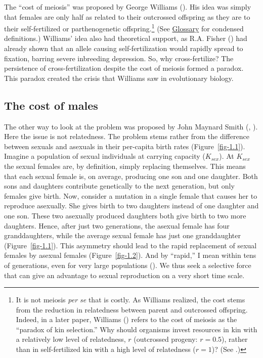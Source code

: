 \documentclass[
  letterpaper,
]{book}
\begin{document}
The ``cost of meiosis'' was proposed by George Williams
(). His idea was simply that females
are only half as related to their outcrossed offspring as they are to
their self-fertilized or parthenogenetic offspring.\footnote{It is not
  meiosis \emph{per se} that is costly. As Williams realized, the cost
  stems from the reduction in relatedness between parent and outcrossed
  offspring. Indeed, in a later paper, Williams
  () refers to the cost of meiosis as
  the ``paradox of kin selection.'' Why should organisms invest
  resources in kin with a relatively low level of relatedness, \(r\)
  (outcrossed progeny: \(r = 0.5\)), rather than in self-fertilized kin
  with a high level of relatedness (\(r = 1\))? (See
  .)} (See
\hyperref[sec-glossary]{Glossary} for condensed definitions.) Williams'
idea also had theoretical support, as R.A. Fisher
() had already shown that an allele
causing self-fertilization would rapidly spread to fixation, barring
severe inbreeding depression. So, why cross-fertilize? The persistence
of cross-fertilization despite the cost of meiosis formed a paradox.
This paradox created the crisis that Williams saw in evolutionary
biology.

\subsection{The cost of males}\label{the-cost-of-males}

The other way to look at the problem was proposed by John Maynard Smith
(, ).
Here the issue is not relatedness. The problem stems rather from the
difference between sexuals and asexuals in their per-capita birth rates
(Figure~\ref{fig-1.1}). Imagine a population of sexual individuals at
carrying capacity (\(K_{sex}\)). At \(K_{sex}\) the sexual females are,
by definition, simply replacing themselves. This means that each sexual
female is, on average, producing one son and one daughter. Both sons and
daughters contribute genetically to the next generation, but only
females give birth. Now, consider a mutation in a single female that
causes her to reproduce asexually. She gives birth to two daughters
instead of one daughter and one son. These two asexually produced
daughters both give birth to two more daughters. Hence, after just two
generations, the asexual female has four granddaughters, while the
average sexual female has just one granddaughter (Figure~\ref{fig-1.1}).
This asymmetry should lead to the rapid replacement of sexual females by
asexual females (Figure~\ref{fig-1.2}). And by ``rapid,'' I mean within
tens of generations, even for very large populations
(). We thus seek a selective
force that can give an advantage to sexual reproduction on a very short
time scale.
\end{document}
